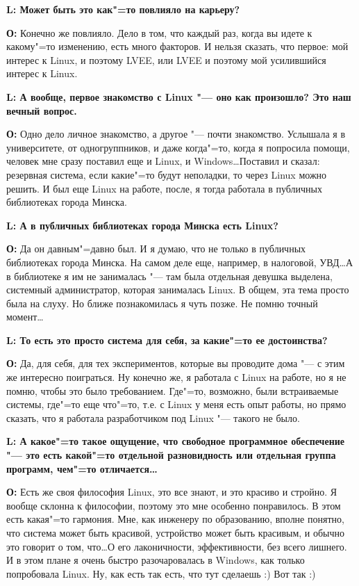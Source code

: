 \documentclass[10pt, a5paper]{article}
\begin{document}
{\noindent \bf L: Может быть это как"=то повлияло на карьеру?}

{\noindent \bf О:} Конечно же повлияло. Дело в том, что каждый раз, когда вы идете к какому"=то изменению, есть много факторов. И нельзя сказать, что первое: мой интерес к Linux, и поэтому LVEE,  или LVEE и поэтому мой усилившийся интерес к Linux.

{\noindent \bf L: А вообще, первое знакомство с Linux "--- оно как произошло? Это наш вечный вопрос.}

{\noindent \bf О:} Одно дело личное знакомство, а другое "--- почти знакомство. Услышала я в университете, от одногруппников, и даже когда"=то, когда я попросила помощи, человек мне сразу поставил еще и Linux, и Windows\ldots Поставил и сказал: резервная система, если какие"=то будут неполадки, то через Linux можно решить. И был еще Linux на работе, после, я тогда работала в публичных библиотеках города Минска.

{\noindent \bf L: А в публичных библиотеках города Минска есть Linux?}

{\noindent \bf О:} Да он давным"=давно был. И я думаю, что не только в публичных библиотеках города Минска. На самом деле еще, например, в налоговой, УВД\ldots А в библиотеке я им не занималась "--- там была отдельная девушка выделена, системный администратор, которая занималась Linux. В общем, эта тема просто была на слуху. Но ближе познакомилась я чуть позже. Не помню точный момент\ldots

{\noindent \bf L: То есть это просто система для себя, за какие"=то ее достоинства?}


{\noindent \bf О:} Да, для себя, для тех экспериментов, которые вы проводите дома "--- с этим же интересно поиграться. Ну конечно же, я работала с Linux на работе, но я не помню, чтобы это было требованием. Где"=то, возможно, были встраиваемые системы, где"=то еще что"=то, т.е. с Linux у меня есть опыт работы, но прямо сказать, что я работала разработчиком под Linux "--- такого не было. 

{\noindent \bf L: А какое"=то такое ощущение, что свободное программное обеспечение "--- это есть какой"=то отдельной разновидность или отдельная группа программ, чем"=то отличается\ldots}

{\noindent \bf О:} Есть же своя философия Linux, это все знают, и это красиво и стройно. Я вообще склонна к философии, поэтому это мне особенно понравилось. В этом есть какая"=то гармония. Мне, как инженеру по образованию, вполне понятно, что система может быть красивой, устройство может быть красивым, и обычно это говорит о том, что\ldots О его лаконичности, эффективности, без всего лишнего. И в этом плане я очень быстро разочаровалась в Windows, как только попробовала Linux. Ну, как есть так есть, что тут сделаешь :) Вот так :)
\end{document}
